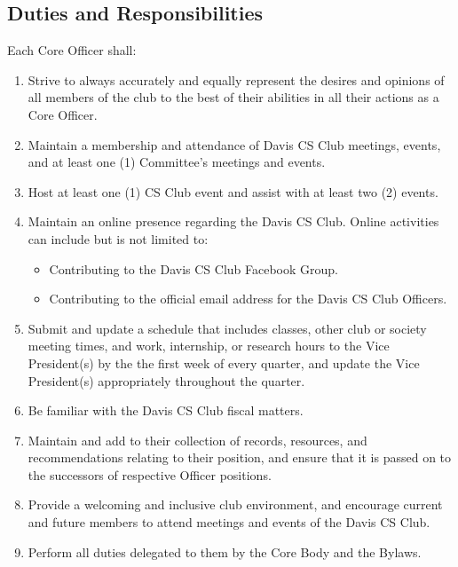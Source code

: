 \documentclass{article}
\newenvironment{li}{
\begin{enumerate}
  \setlength{\itemsep}{1pt}
  \setlength{\parskip}{0pt}
  \setlength{\parsep}{0pt}
}{\end{enumerate}}
\begin{document}
\subsection{Duties and Responsibilities}
Each Core Officer shall:
\begin{li}
\item Strive to always accurately and equally represent the desires and opinions of all members of the club to the best of their abilities in all their actions as a Core Officer.
\item Maintain a membership and attendance of Davis CS Club meetings, events, and at least one (1) Committee's meetings and events.
\item Host at least one (1) CS Club event and assist with at least two (2) events.
\item Maintain an online presence regarding the Davis CS Club. Online activities can include but is not limited to:
	\begin{itemize}
	  \setlength{\itemsep}{1pt}
	  \setlength{\parskip}{0pt}
	  \setlength{\parsep}{0pt}
	\item Contributing to the Davis CS Club Facebook Group.
	\item Contributing to the official email address for the Davis CS Club Officers.
	\end{itemize}
\item Submit and update a schedule that includes classes, other club or society meeting times, and work, internship, or research hours to the Vice President(s) by the the first week of every quarter, and update the Vice President(s) appropriately throughout the quarter.
\item Be familiar with the Davis CS Club fiscal matters.
\item Maintain and add to their collection of records, resources, and recommendations relating to their position, and ensure that it is passed on to the successors of respective Officer positions.
\item Provide a welcoming and inclusive club environment, and encourage current and future members to attend meetings and events of the Davis CS Club.
\item Perform all duties delegated to them by the Core Body and the Bylaws.
\end{li}
\end{document}
